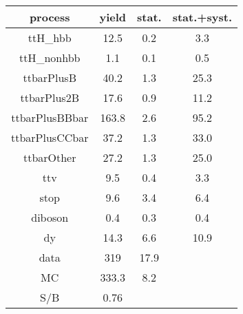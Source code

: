\begin{tabular}{cccc}
\hline
    process     &  yield  &  stat.  &  stat.+syst.  \\
\hline
    ttH\_hbb     &  12.5   &   0.2   &      3.3      \\
   ttH\_nonhbb   &   1.1   &   0.1   &      0.5      \\
   ttbarPlusB   &  40.2   &   1.3   &     25.3      \\
  ttbarPlus2B   &  17.6   &   0.9   &     11.2      \\
 ttbarPlusBBbar &  163.8  &   2.6   &     95.2      \\
 ttbarPlusCCbar &  37.2   &   1.3   &     33.0      \\
   ttbarOther   &  27.2   &   1.3   &     25.0      \\
      ttv       &   9.5   &   0.4   &      3.3      \\
      stop      &   9.6   &   3.4   &      6.4      \\
    diboson     &   0.4   &   0.3   &      0.4      \\
       dy       &  14.3   &   6.6   &     10.9      \\
      data      &   319   &  17.9   &               \\
       MC       &  333.3  &   8.2   &               \\
      S/B       &  0.76   &         &               \\
\hline
\end{tabular}
